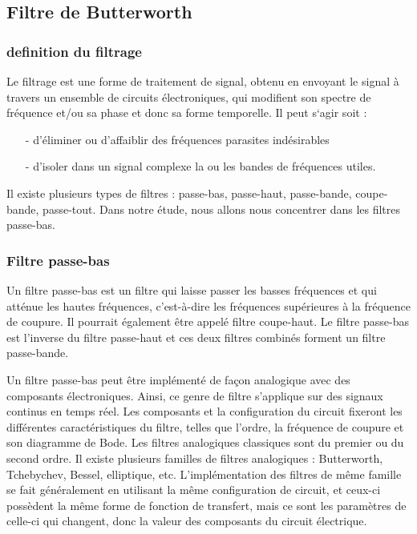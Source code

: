 \documentclass[conference,onecolumn]{IEEEtran}
\begin{document}
\subsection{\textbf{Filtre de Butterworth}}

\subsubsection{definition du filtrage}
\medskip
Le filtrage est une forme de traitement de signal, obtenu en envoyant le signal à travers un ensemble de circuits électroniques, qui modifient son spectre de fréquence et/ou sa phase et donc sa forme temporelle. Il peut s‘agir soit : 

\begin{itemize}
    \item[-] d’éliminer ou d’affaiblir des fréquences parasites indésirables 

    \item[-] d’isoler dans un signal complexe la ou les bandes de fréquences utiles. 
\end{itemize}

Il existe plusieurs types de filtres : passe-bas, passe-haut, passe-bande, coupe-bande, passe-tout. Dans notre étude, nous allons nous concentrer dans les filtres passe-bas.

\medskip
\subsubsection{Filtre passe-bas}
Un filtre passe-bas est un filtre qui laisse passer les basses fréquences et qui atténue les hautes fréquences, c'est-à-dire les fréquences supérieures à la fréquence de coupure. Il pourrait également être appelé filtre coupe-haut. Le filtre passe-bas est l'inverse du filtre passe-haut et ces deux filtres combinés forment un filtre passe-bande. 

Un filtre passe-bas peut être implémenté de façon analogique avec des composants électroniques. Ainsi, ce genre de filtre s'applique sur des signaux continus en temps réel. Les composants et la configuration du circuit fixeront les différentes caractéristiques du filtre, telles que l'ordre, la fréquence de coupure et son diagramme de Bode. Les filtres analogiques classiques sont du premier ou du second ordre. Il existe plusieurs familles de filtres analogiques : Butterworth, Tchebychev, Bessel, elliptique, etc. L'implémentation des filtres de même famille se fait généralement en utilisant la même configuration de circuit, et ceux-ci possèdent la même forme de fonction de transfert, mais ce sont les paramètres de celle-ci qui changent, donc la valeur des composants du circuit électrique.
\medskip
\end{document}
